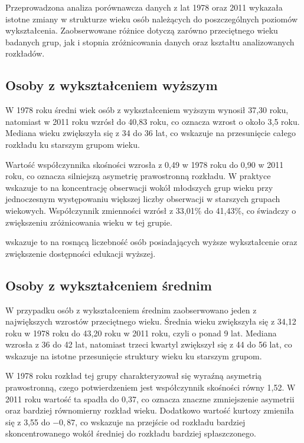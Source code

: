 \documentclass[10pt]{article}
\begin{document}
Przeprowadzona analiza porównawcza danych z lat 1978 oraz 2011 wykazała istotne zmiany w strukturze wieku osób należących do poszczególnych poziomów wykształcenia. Zaobserwowane różnice dotyczą zarówno przeciętnego wieku badanych grup, jak i stopnia zróżnicowania danych oraz kształtu analizowanych rozkładów.

\subsection{Osoby z wykształceniem wyższym}

W 1978 roku średni wiek osób z wykształceniem wyższym wynosił 37{,}30 roku, natomiast w 2011 roku wzrósł do 40{,}83 roku, co oznacza wzrost o około 3{,}5 roku. Mediana wieku zwiększyła się z 34 do 36 lat, co wskazuje na przesunięcie całego rozkładu ku starszym grupom wieku.

Wartość współczynnika skośności wzrosła z 0{,}49 w 1978 roku do 0{,}90 w 2011 roku, co oznacza silniejszą asymetrię prawostronną rozkładu. W praktyce wskazuje to na koncentrację obserwacji wokół młodszych grup wieku przy jednoczesnym występowaniu większej liczby obserwacji w starszych grupach wiekowych. Współczynnik zmienności wzrósł z 33{,}01\% do 41{,}43\%, co świadczy o zwiększeniu zróżnicowania wieku w tej grupie.

wskazuje to na rosnącą liczebność osób posiadających wyższe wykształcenie oraz zwiększenie dostępności edukacji wyższej.

\subsection{Osoby z wykształceniem średnim}

W przypadku osób z wykształceniem średnim zaobserwowano jeden z największych wzrostów przeciętnego wieku. Średnia wieku zwiększyła się z 34{,}12 roku w 1978 roku do 43{,}20 roku w 2011 roku, czyli o ponad 9 lat. Mediana wzrosła z 36 do 42 lat, natomiast trzeci kwartyl zwiększył się z 44 do 56 lat, co wskazuje na istotne przesunięcie struktury wieku ku starszym grupom.

W 1978 roku rozkład tej grupy charakteryzował się wyraźną asymetrią prawostronną, czego potwierdzeniem jest współczynnik skośności równy 1{,}52. W 2011 roku wartość ta spadła do 0{,}37, co oznacza znaczne zmniejszenie asymetrii oraz bardziej równomierny rozkład wieku. Dodatkowo wartość kurtozy zmieniła się z 3{,}55 do $-0{,}87$, co wskazuje na przejście od rozkładu bardziej skoncentrowanego wokół średniej do rozkładu bardziej spłaszczonego.
\end{document}
